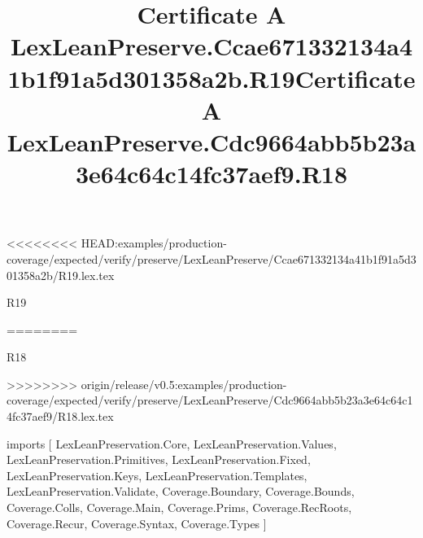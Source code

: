 <<<<<<<< HEAD:examples/production-coverage/expected/verify/preserve/LexLeanPreserve/Ccae671332134a41b1f91a5d301358a2b/R19.lex.tex
\begin{lexlean}{R19}
\title{Certificate A LexLeanPreserve.Ccae671332134a41b1f91a5d301358a2b.R19}
========
\begin{lexlean}{R18}
\title{Certificate A LexLeanPreserve.Cdc9664abb5b23a3e64c64c14fc37aef9.R18}
>>>>>>>> origin/release/v0.5:examples/production-coverage/expected/verify/preserve/LexLeanPreserve/Cdc9664abb5b23a3e64c64c14fc37aef9/R18.lex.tex
\begin{coremodule}
imports [
  LexLeanPreservation.Core,
  LexLeanPreservation.Values,
  LexLeanPreservation.Primitives,
  LexLeanPreservation.Fixed,
  LexLeanPreservation.Keys,
  LexLeanPreservation.Templates,
  LexLeanPreservation.Validate,
  Coverage.Boundary,
  Coverage.Bounds,
  Coverage.Colls,
  Coverage.Main,
  Coverage.Prims,
  Coverage.RecRoots,
  Coverage.Recur,
  Coverage.Syntax,
  Coverage.Types
]


\end{coremodule}
\end{lexlean}
\end{lexlean}

